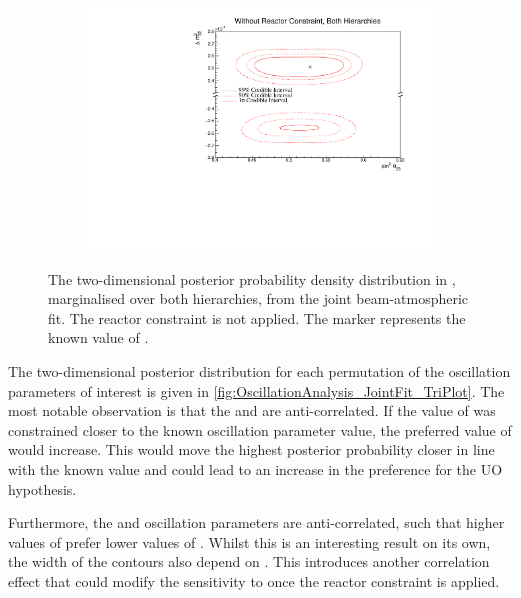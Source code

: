 \begin{figure}[h]
  \begin{subfigure}[t]{0.95\textwidth}
    \includegraphics[width=\textwidth, trim={0mm 0mm 0mm 0mm}, clip,page=1]{Figures/OA/JointFit/Contours_2D_th23_dm32_BH_0_woRC_UnSmeared_CredibleInterval.pdf}
  \end{subfigure}
  \caption{The two-dimensional posterior probability density distribution in , marginalised over both hierarchies, from the joint beam-atmospheric fit. The reactor constraint is not applied. The marker represents the known value of .}
  \label{fig:OscillationAnalysis_JointFit_DM32TH23}
\end{figure}


The two-dimensional posterior distribution for each permutation of the oscillation parameters of interest is given in \autoref{fig:OscillationAnalysis_JointFit_TriPlot}. The most notable observation is that the  and  are anti-correlated. If the value of  was constrained closer to the known oscillation parameter value, the preferred value of  would increase. This would move the highest posterior probability closer in line with the known value and could lead to an increase in the preference for the UO hypothesis.

Furthermore, the  and  oscillation parameters are anti-correlated, such that higher values of  prefer lower values of . Whilst this is an interesting result on its own, the width of the  contours also depend on . This introduces another correlation effect that could modify the sensitivity to  once the reactor constraint is applied.

